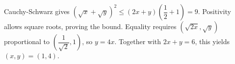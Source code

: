 Cauchy-Schwarz gives $(\sqrt x+\sqrt y)^2\le(2x+y)(\dfrac{1}{2}+1)=9 $. Positivity allows square roots, proving the bound. Equality requires $(\sqrt{2x},\sqrt y)$ proportional to $(\dfrac{1}{\sqrt2},1)$, so $ y=4x $. Together with $ 2x+y=6 $, this yields $\boxed{(x,y)=(1,4)}$.

